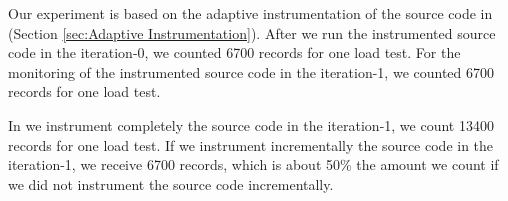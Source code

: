 Our experiment is based on the adaptive instrumentation of the source code in (Section \ref{sec:Adaptive Instrumentation}). After we run the instrumented source code in the iteration-0, we counted 6700 records for one load test. For the monitoring of the instrumented source code in the iteration-1, we counted 6700 records for one load test. 

In we instrument completely the source code in the iteration-1, we count 13400 records for one load test. If we instrument incrementally the source code in the iteration-1, we receive 6700 records, which is about 50\% the amount we count if we did not instrument the source code incrementally.







